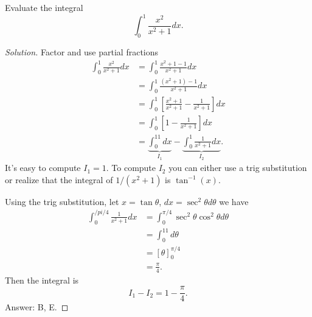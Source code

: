 \begin{problem}
Evaluate the integral
\[
\int_0^1 \frac{x^2}{x^2+1}dx.
\]
\end{problem}
\begin{proof}[Solution]
Factor and use partial fractions
\begin{align*}
\int_0^1 \frac{x^2}{x^2+1}dx
&=\int_0^1\frac{x^2+1-1}{x^2+1}dx\\
&=\int_0^1\frac{\left(x^2+1\right)-1}{x^2+1}dx\\
&=\int_0^1\left[\frac{x^2+1}{x^2+1}-\frac{1}{x^2+1}\right]dx\\
&=\int_0^1\left[1-\frac{1}{x^2+1}\right]dx\\
&=\underbrace{\int_0^11dx}_{I_1}-\underbrace{\int_0^1\frac{1}{x^2+1}dx}_{I_2}.
\end{align*}
It's easy to compute $I_1=1$. To compute $I_2$ you can either use a trig
substitution or realize that the integral of $1/(x^2+1)$ is
$\tan^{-1}(x)$.

Using the trig substitution, let $x=\tan\theta$, $dx=\sec^2\theta d\theta$
we have
\begin{align*}
\int_0^{/pi/4}\frac{1}{x^2+1}dx
&=\int_0^{\pi/4}\sec^2\theta\cos^2\theta d\theta\\
&=\int_0^11d\theta\\
&=\left[\theta\right]_0^{\pi/4}\\
&=\frac{\pi}{4}.
\end{align*}
Then the integral is
\[
I_1-I_2=\boxed{1-\frac{\pi}{4}.}
\]
Answer: {\color{Red} B}, {\color{Green}E}.
\end{proof}

